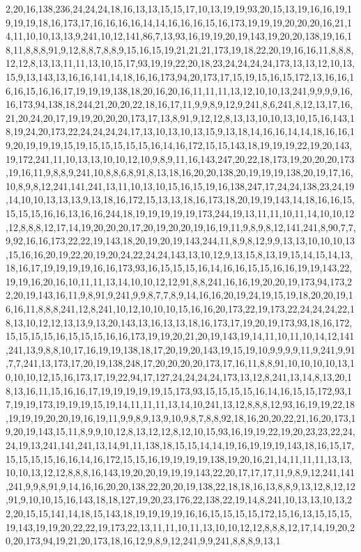 2,20,16,138,236,24,24,24,18,16,13,13,15,15,17,10,13,19,19,93,20,15,13,19,16,16,19,19,19,19,18,16,173,17,16,16,16,16,14,14,16,16,16,15,16,173,19,19,19,20,20,20,16,21,14,11,10,10,13,13,9,241,10,12,141,86,7,13,93,16,19,19,20,19,143,19,20,20,138,19,16,18,11,8,8,8,91,9,12,8,8,7,8,8,9,15,16,15,19,21,21,21,173,19,18,22,20,19,16,16,11,8,8,8,12,12,8,13,13,11,11,13,10,15,17,93,19,19,22,20,18,23,24,24,24,24,173,13,13,12,10,13,15,9,13,143,13,16,16,141,14,18,16,16,173,94,20,173,17,15,19,15,16,15,172,13,16,16,16,16,15,16,16,17,19,19,19,138,18,20,16,20,16,11,11,11,13,12,10,10,13,241,9,9,9,9,16,16,173,94,138,18,244,21,20,20,22,18,16,17,11,9,9,8,9,12,9,241,8,6,241,8,12,13,17,16,21,20,24,20,17,19,19,20,20,20,173,17,13,8,91,9,12,12,8,13,13,10,10,13,10,15,16,143,18,19,24,20,173,22,24,24,24,24,17,13,10,13,10,13,15,9,13,18,14,16,16,14,14,18,16,16,19,20,19,19,19,15,19,15,15,15,15,15,16,14,16,172,15,15,143,18,19,19,19,22,19,20,143,19,172,241,11,10,13,13,10,10,12,10,9,8,9,11,16,143,247,20,22,18,173,19,20,20,20,173,19,16,11,9,8,8,9,241,10,8,8,6,8,91,8,13,18,16,20,20,138,20,19,19,19,138,20,19,17,16,10,8,9,8,12,241,141,241,13,11,10,13,10,15,16,15,19,16,138,247,17,24,24,138,23,24,19,14,10,10,13,13,13,9,13,18,16,172,15,13,13,18,16,173,18,20,19,19,143,14,18,16,16,15,15,15,15,16,16,13,16,16,244,18,19,19,19,19,19,173,244,19,13,11,11,10,11,14,10,10,12,12,8,8,8,12,17,14,19,20,20,20,17,20,19,20,20,19,16,19,11,9,8,9,8,12,141,241,8,90,7,7,9,92,16,16,173,22,22,19,143,18,20,19,20,19,143,244,11,8,9,8,12,9,9,13,13,10,10,10,13,15,16,16,20,19,22,20,19,20,24,22,24,24,143,13,10,12,9,13,15,8,13,19,15,14,15,14,13,18,16,17,19,19,19,19,16,16,173,93,16,15,15,15,16,14,16,16,15,15,16,16,19,19,143,22,19,19,16,20,16,10,11,11,13,14,10,10,12,12,91,8,8,241,16,16,19,20,20,19,173,94,173,22,20,19,143,16,11,9,8,91,9,241,9,9,8,7,7,8,9,14,16,16,20,19,24,19,15,19,18,20,20,19,16,16,11,8,8,8,241,12,8,241,10,12,10,10,10,15,16,16,20,173,22,19,173,22,24,24,24,22,18,13,10,12,12,13,13,9,13,20,143,13,16,13,13,18,16,173,17,19,20,19,173,93,18,16,172,15,15,15,15,16,15,15,15,16,16,173,19,19,20,21,20,19,143,19,14,11,10,11,10,14,12,141,241,13,9,8,8,10,17,16,19,19,138,18,17,20,19,20,143,19,15,19,10,9,9,9,9,11,9,241,9,91,7,7,241,13,173,17,20,19,138,248,17,20,20,20,20,173,17,16,11,8,8,91,10,10,10,10,13,10,10,10,12,15,16,173,17,19,22,94,17,127,24,24,24,24,173,13,12,8,241,13,14,8,13,20,18,13,16,11,15,16,16,17,19,19,19,19,19,15,173,93,15,15,15,15,16,14,16,15,15,172,93,17,19,19,173,19,19,19,15,19,14,11,11,11,13,14,10,241,13,12,8,8,8,12,93,16,19,19,22,18,19,19,19,20,20,19,16,19,11,9,9,8,9,13,9,10,9,8,7,8,8,92,18,16,20,20,22,21,16,20,173,19,20,19,143,15,11,8,9,9,10,12,8,13,12,12,8,12,10,15,93,16,19,19,22,19,20,23,23,22,24,24,19,13,241,141,241,13,14,91,11,138,18,15,15,14,14,19,16,19,19,19,143,18,16,15,17,15,15,15,15,16,16,14,16,172,15,15,16,19,19,19,19,138,19,20,16,21,14,11,11,11,13,13,10,10,13,12,12,8,8,8,16,143,19,20,20,19,19,19,143,22,20,17,17,17,11,9,8,9,12,241,141,241,9,9,8,91,9,14,16,16,20,20,138,22,20,20,19,138,22,18,18,16,13,8,8,9,13,12,8,12,12,91,9,10,10,15,16,143,18,18,127,19,20,23,176,22,138,22,19,14,8,241,10,13,13,10,13,22,20,15,15,141,14,18,15,143,18,19,19,19,19,16,16,15,15,15,15,172,15,16,13,15,15,15,19,143,19,19,20,22,22,19,173,22,13,11,11,10,11,13,10,10,12,12,8,8,8,12,17,14,19,20,20,20,173,94,19,21,20,173,18,16,12,9,8,9,12,241,9,9,241,8,8,8,9,13,1